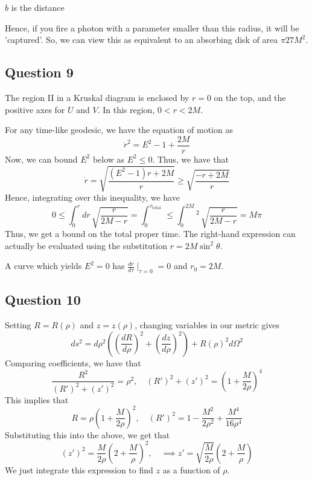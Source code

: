 \documentclass[11pt, oneside]{article}   	%
\theoremstyle{slanted}
\begin{document}
$ b $ is the distance 

Hence, if you fire a photon with a 
parameter smaller than this radius, it will 
be 'captured'. So, we can 
view this as equivalent to an absorbing
disk of area $ \pi 27 M ^ 2 $. 

\subsection{Question 9}
The region II 
in a Kruskal diagram is enclosed by 
$ r = 0 $ on the top, 
and the positive axes for $ U $ and $ V $. 
In this region, $ 0 < r < 2M $. 

For any time-like geodesic, 
we have the equation of motion as
\[
 \dot{ r } ^ 2  = E ^ 2  - 1 + \frac{2M}{r }  
\] Now, we can bound $ E ^ 2 $ below as $ E ^ 2 \leq 0 $. 
Thus, we have that 
\[
	\dot{ r  }  = \sqrt{ \frac{\left( E ^ 2  - 1  \right)  r + 2 M }{ r } }  
	\geq \sqrt{\frac{ - r + 2 M }{ r } } 
\] Hence, 
integrating over this inequality, we have 
\[
 0 \leq \int_ 0 ^ r dr \, \sqrt{ 
 \frac{r }{ 2 M  - r } }   = \int_ 0 ^{ \tau_{ \text{total }  } } 
 \leq \int _ 0 ^{ 2 M } ^2 \, \sqrt{\frac{r }{ 2M  - r   }}   = M \pi 
\] Thus, we 
get a bound on the total proper time. 
The right-hand expression 
can actually be evaluated 
using the substitution 
$ r  = 2 M \sin ^ 2 \theta $. 

A curve which yields $ E ^ 2  =0 $
has $ \frac{dr }{ d\tau  }\mid_{ \tau  =0 }  = 0  $ 
and $ r_0  = 2 M $. 

\subsection{Question 10}
Setting $ R  = R \left( \rho  \right)  $ and $ z  = z \left( \rho  \right)  $, 
changing variables in our 
metric gives 
\[
 ds ^ 2  = d \rho ^ 2 \left( 
 \left( \frac{dR }{ d \rho }  \right) ^ 2 + \left( \frac{dz }{ d \rho }  \right)  
 ^ 2  \right) + R \left( \rho  \right)  ^ 2 d \Omega ^ 2  
\] Comparing coefficients, 
we have that 
\[
	\frac{R ^ 2 }{ \left(  R '  \right)  ^ 2 + \left( 
	z ' \right)  ^ 2 }  = \rho ^ 2 , \quad \left( R '  \right)  ^2 
	+ \left( z '  \right)  ^ 2  = \left( 1 +  \frac{M}{2 \rho}  \right)  ^4 
\] This implies that 
\[
 R  = \rho \left(  1 + \frac{M}{2 \rho }   \right)  ^2, 
 \quad ( R ' )^ 2  = 1 - \frac{M^ 2 }{ 2 \rho ^ 2 } + \frac{M ^ 4 }{16 \rho ^ 4  }
\]  Substituting this into the above, 
we get that 
\[
	\left( z '  \right) ^2  = \frac{M }{ 2 \rho } \left( 2 
	+ \frac{M}{\rho } \right)  ^2 , \quad 
	\implies  z ' = \sqrt{ \frac{M }{ 2 \rho } }  (2 + \frac{M}{\rho }  )
\] 
We just integrate this expression to find $ z $ as a function 
of $ \rho $. 
\end{document}
